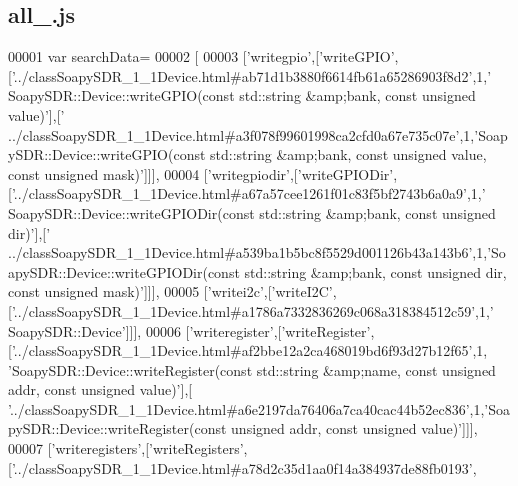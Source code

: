\subsection{all\+\_.\+js}
\label{all__13_8js_source}

\begin{DoxyCode}
00001 var searchData=
00002 [
00003   [\textcolor{stringliteral}{'writegpio'},[\textcolor{stringliteral}{'writeGPIO'},[\textcolor{stringliteral}{'../classSoapySDR\_1\_1Device.html#ab71d1b3880f6614fb61a65286903f8d2'},1,\textcolor{stringliteral}{'
      SoapySDR::Device::writeGPIO(const std::string &amp;bank, const unsigned value)'}],[\textcolor{stringliteral}{'
      ../classSoapySDR\_1\_1Device.html#a3f078f99601998ca2cfd0a67e735c07e'},1,\textcolor{stringliteral}{'SoapySDR::Device::writeGPIO(const std::string &amp;bank, const
       unsigned value, const unsigned mask)'}]]],
00004   [\textcolor{stringliteral}{'writegpiodir'},[\textcolor{stringliteral}{'writeGPIODir'},[\textcolor{stringliteral}{'../classSoapySDR\_1\_1Device.html#a67a57cee1261f01c83f5bf2743b6a0a9'},1,\textcolor{stringliteral}{'
      SoapySDR::Device::writeGPIODir(const std::string &amp;bank, const unsigned dir)'}],[\textcolor{stringliteral}{'
      ../classSoapySDR\_1\_1Device.html#a539ba1b5bc8f5529d001126b43a143b6'},1,\textcolor{stringliteral}{'SoapySDR::Device::writeGPIODir(const std::string &amp;bank,
       const unsigned dir, const unsigned mask)'}]]],
00005   [\textcolor{stringliteral}{'writei2c'},[\textcolor{stringliteral}{'writeI2C'},[\textcolor{stringliteral}{'../classSoapySDR\_1\_1Device.html#a1786a7332836269c068a318384512c59'},1,\textcolor{stringliteral}{'
      SoapySDR::Device'}]]],
00006   [\textcolor{stringliteral}{'writeregister'},[\textcolor{stringliteral}{'writeRegister'},[\textcolor{stringliteral}{'../classSoapySDR\_1\_1Device.html#af2bbe12a2ca468019bd6f93d27b12f65'},1,\textcolor{stringliteral}{
      'SoapySDR::Device::writeRegister(const std::string &amp;name, const unsigned addr, const unsigned value)'}],[\textcolor{stringliteral}{
      '../classSoapySDR\_1\_1Device.html#a6e2197da76406a7ca40cac44b52ec836'},1,\textcolor{stringliteral}{'SoapySDR::Device::writeRegister(const
       unsigned addr, const unsigned value)'}]]],
00007   [\textcolor{stringliteral}{'writeregisters'},[\textcolor{stringliteral}{'writeRegisters'},[\textcolor{stringliteral}{'../classSoapySDR\_1\_1Device.html#a78d2c35d1aa0f14a384937de88fb0193'},

\end{DoxyCode}
